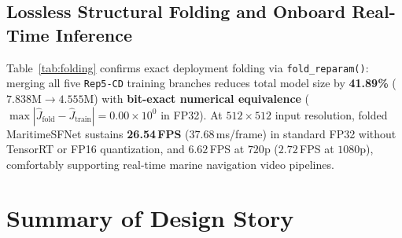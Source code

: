 \documentclass[journal,twoside]{IEEEtran}
\begin{document}
\subsection{Lossless Structural Folding and Onboard Real-Time Inference}
\label{sec:folding}

\begin{table}[t]
\centering
\caption{Lossless \texttt{Rep5-CD} Folding Verification and FP32 Inference Throughput on a Single NVIDIA RTX~3090}
\label{tab:folding}
\renewcommand{\arraystretch}{1.15}
\setlength{\tabcolsep}{3.8pt}
\end{table}

Table~\ref{tab:folding} confirms exact deployment folding via \texttt{fold\_reparam()}: merging all five \texttt{Rep5-CD} training branches reduces total model size by \textbf{41.89\%} ($7.838\text{M}\to 4.555\text{M}$) with \textbf{bit-exact numerical equivalence} ($\max|\hat{J}_{\mathrm{fold}}-\hat{J}_{\mathrm{train}}|=0.00\times 10^0$ in FP32). At $512\times 512$ input resolution, folded MaritimeSFNet sustains \textbf{26.54\,FPS} ($37.68$\,ms/frame) in standard FP32 without TensorRT or FP16 quantization, and $6.62$\,FPS at $720\text{p}$ ($2.72$\,FPS at $1080\text{p}$), comfortably supporting real-time marine navigation video pipelines.

\section{Summary of Design Story}
\label{sec:conclusion}
\end{document}
